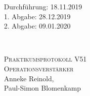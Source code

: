 



\begin{titlepage}
  \begin{flushleft}
 Durchführung: 18.11.2019\\
 1. Abgabe: 28.12.2019\\
 2. Abgabe: 09.01.2020
  \end{flushleft}


\HRule\\[1,0cm]

 \begin{center}


\textsc{\LARGE Praktikumsprotokoll V51}\\[1.5cm]
\textsc{\huge Operationsverstärker} \\[5,5cm]

Anneke Reinold\footnotemark[1], \\
Paul-Simon Blomenkamp\footnotemark[2] \\[1,0cm]



 \end{center}
\HRule

 \vfill
\end{titlepage}






\printbibliography


